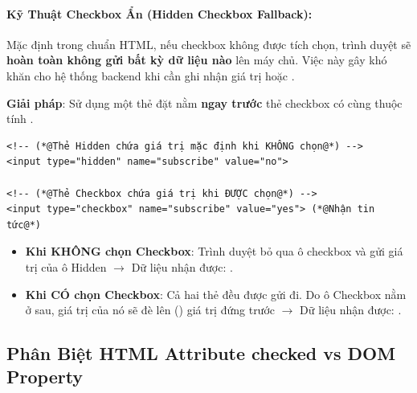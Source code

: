 \paragraph{Kỹ Thuật Checkbox Ẩn (Hidden Checkbox Fallback):}
Mặc định trong chuẩn HTML, nếu checkbox không được tích chọn, trình duyệt sẽ \textbf{hoàn toàn không gửi bất kỳ dữ liệu nào} lên máy chủ. Việc này gây khó khăn cho hệ thống backend khi cần ghi nhận giá trị  hoặc .

\textbf{Giải pháp}: Sử dụng một thẻ  đặt nằm \textbf{ngay trước} thẻ checkbox có cùng thuộc tính .

\begin{codeWindow}
\begin{lstlisting}[language=HTML5]
<!-- (*@Thẻ Hidden chứa giá trị mặc định khi KHÔNG chọn@*) -->
<input type="hidden" name="subscribe" value="no">

<!-- (*@Thẻ Checkbox chứa giá trị khi ĐƯỢC chọn@*) -->
<input type="checkbox" name="subscribe" value="yes"> (*@Nhận tin tức@*)
\end{lstlisting}
\end{codeWindow}

\begin{conceptBox}
\begin{itemize}[leftmargin=1.5em, itemsep=2pt, parsep=0pt]
    \item \textbf{Khi KHÔNG chọn Checkbox}: Trình duyệt bỏ qua ô checkbox và gửi giá trị của ô Hidden $\rightarrow$ Dữ liệu nhận được: .
    \item \textbf{Khi CÓ chọn Checkbox}: Cả hai thẻ đều được gửi đi. Do ô Checkbox nằm ở sau, giá trị  của nó sẽ đè lên () giá trị  đứng trước $\rightarrow$ Dữ liệu nhận được: .
\end{itemize}
\end{conceptBox}

\subsection{Phân Biệt HTML Attribute checked vs DOM Property}

